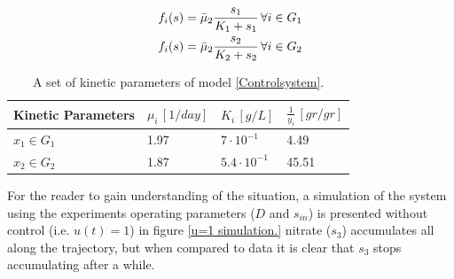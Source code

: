 \documentclass[processes,article,submit,moreauthors,pdftex]{Definitions/mdpi}
\begin{document}
\begin{align}
\label{monod} f_i(s) &= \bar{\mu}_2 \dfrac{s_1}{K_1 +s_1} \, \forall i \in G_1 \\
\notag  f_i(s) &= \bar{\mu}_2 \dfrac{s_2}{K_2 +s_2 } \, \forall i \in G_2
\end{align}

\begin{table}[ht]
	\centering
	\begin{tabular}{|l|l|l|l|}
		\hline
		Kinetic Parameters & $\mu_i\,[1/day]$ & $K_i\,[g/L]$ & $\frac{1}{y_i} \, [gr/gr]$ \\ \hline
		$x_1 \in G_1$ & 1.97  & $7\cdot 10^{-1}$ & 4.49  \\ \hline
		$x_2\in G_2$ & 1.87 & $5.4\cdot 10^{-1}$ &  45.51 \\ \hline
	\end{tabular}	
	\caption{A set of kinetic parameters of model \eqref{Controlsystem}.}
	\label{kinetic_parameters_application}
\end{table}
For the reader to gain understanding of the situation, a simulation of the system using the experiments operating parameters ($D$ and $s_{in}$) is presented without control (i.e. $u(t)= 1$) in  figure \ref{u=1 simulation.} nitrate ($s_3$) accumulates all along the trajectory, but when compared to data it is clear that $s_3$ stops accumulating after a while. 
\end{document}

